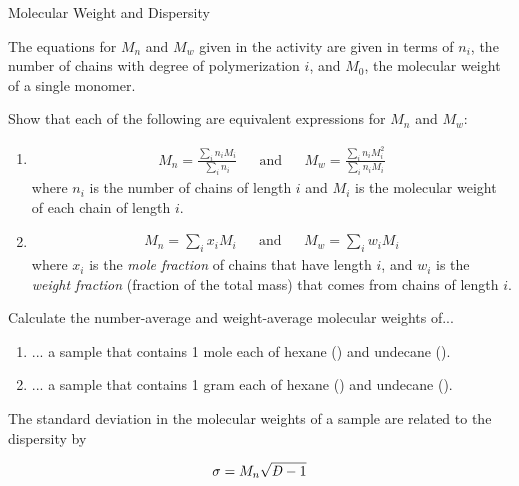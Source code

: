 \begin{activity}{Molecular Weight and Dispersity}
\begin{ctqs}
\end{ctqs}



\begin{exercises}

		\exercise The equations for $M_n$ and $M_w$ given in the activity are given in terms of $n_i$, the number of chains with degree of polymerization $i$, and $M_0$, the molecular weight of a single monomer.
		
		Show that each of the following are equivalent expressions for $M_n$ and $M_w$:
		
			\begin{enumerate}
				
				\item \begin{align*}
					M_n = \frac{\sum_i n_i M_i}{\sum_i n_i} && \text{and} &&  M_w = \frac{\sum_i n_i M_i^2}{\sum_i n_i M_i}
				\end{align*}
					where $n_i$ is the number of chains of length $i$ and $M_i$ is the molecular weight of each chain of length $i$.
				
				\item  \begin{align*}
					M_n = \sum_i x_i M_i && \text{and} && M_w = \sum_i w_i M_i
				\end{align*}
					where $x_i$ is the \emph{mole fraction} of chains that have length $i$, and $w_i$ is the \emph{weight fraction} (fraction of the total mass) that comes from chains of length $i$.
				
			\end{enumerate}
			
		\exercise Calculate the number-average and weight-average molecular weights of...
		
			\begin{enumerate}
			
				\item ... a sample that contains 1 mole each of hexane () and undecane ().
				
				\item ... a sample that contains 1 gram each of hexane () and undecane ().
				
			\end{enumerate}
			
		\exercise The standard deviation in the molecular weights of a sample are related to the dispersity by
		
			\begin{align*}
					\sigma = M_n\sqrt{\PDImath - 1}
			\end{align*}
			

\end{exercises}
\end{activity}
